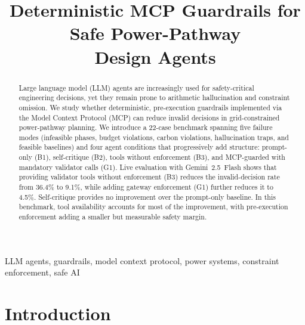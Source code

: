 \documentclass[conference]{IEEEtran}
\begin{document}
\title{Deterministic MCP Guardrails for Safe Power-Pathway\\Design Agents}

\author{%
}

\maketitle

\begin{abstract}
Large language model (LLM) agents are increasingly used for safety-critical
engineering decisions, yet they remain prone to arithmetic hallucination and
constraint omission.  We study whether deterministic, pre-execution guardrails
implemented via the Model Context Protocol (MCP) can reduce invalid
decisions in grid-constrained power-pathway planning.  We introduce a
22-case benchmark spanning five failure modes (infeasible phases, budget
violations, carbon violations, hallucination traps, and feasible baselines)
and four agent conditions that progressively add structure: prompt-only (B1),
self-critique (B2), tools without enforcement (B3), and MCP-guarded with
mandatory validator calls (G1).  Live evaluation with Gemini~2.5~Flash
shows that providing validator tools without enforcement (B3) reduces the
invalid-decision rate from 36.4\% to 9.1\%, while adding gateway
enforcement (G1) further reduces it to 4.5\%.  Self-critique provides no
improvement over the prompt-only baseline.  In this benchmark, tool
availability accounts for most of the improvement, with pre-execution
enforcement adding a smaller but measurable safety margin.
\end{abstract}

\begin{IEEEkeywords}
LLM agents, guardrails, model context protocol, power systems, constraint
enforcement, safe AI
\end{IEEEkeywords}

\section{Introduction}
\end{document}
